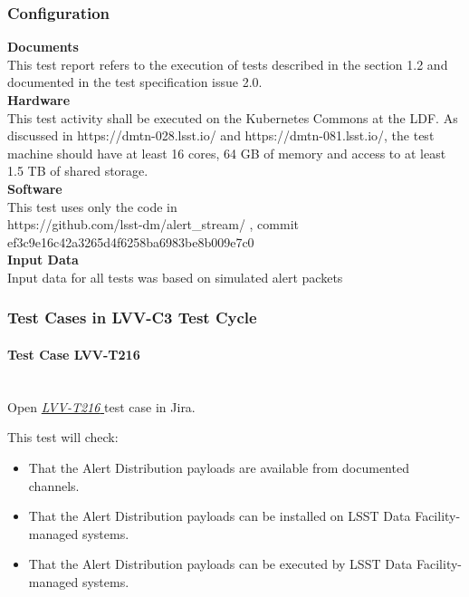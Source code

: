 \documentclass[DM,lsstdraft,STR,toc]{lsstdoc}
\providecommand{\tightlist}{
  \setlength{\itemsep}{0pt}\setlength{\parskip}{0pt}}
\begin{document}
  \subsubsection{Configuration}
    \textbf{Documents}\\[2\baselineskip]This test report refers to the
execution of tests described in the section 1.2 and documented in the
 test specification issue
2.0.\\[2\baselineskip]\textbf{Hardware}\\[2\baselineskip]This test
activity shall be executed on the Kubernetes Commons at the LDF. As
discussed in https://dmtn-028.lsst.io/ and https://dmtn-081.lsst.io/,
the test machine should have at least 16 cores, 64 GB of memory and
access to at least 1.5 TB of shared
storage.\\[2\baselineskip]\textbf{Software}\\[2\baselineskip]This test
uses only the code in\\
https://github.com/lsst-dm/alert\_stream/ , commit
ef3c9e16c42a3265d4f6258ba6983be8b009e7c0\\[2\baselineskip]\textbf{Input
Data}\\[2\baselineskip]Input data for all tests was based on simulated
alert packets\\[2\baselineskip]


  \subsubsection{Test Cases in LVV-C3 Test Cycle}


    \paragraph{Test Case LVV-T216 }\mbox{}\\

Open  \href{https://jira.lsstcorp.org/secure/Tests.jspa#/testCase/LVV-T216}{\textit{ LVV-T216 } }
test case in Jira.

    This test will check:\\

\begin{itemize}
\tightlist
\item
  That the Alert Distribution payloads are available from documented
  channels.
\item
  That the Alert Distribution payloads can be installed on LSST Data
  Facility-managed systems.
\item
  That the Alert Distribution payloads can be executed by LSST Data
  Facility-managed systems.
\end{itemize}
\end{document}
